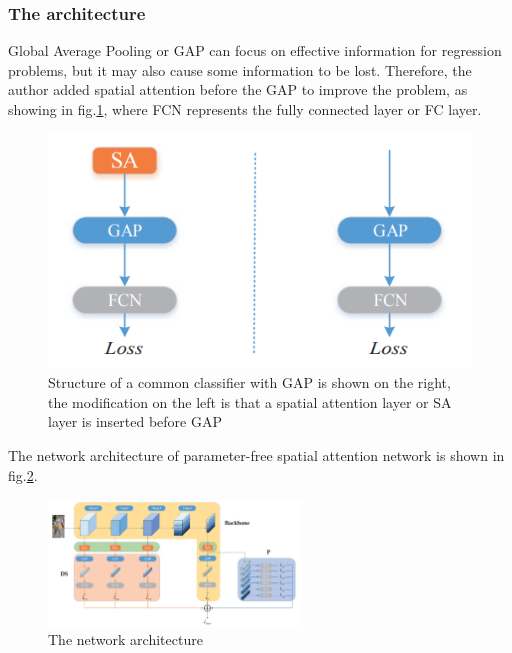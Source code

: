 \subsubsection{The architecture}
\hspace{0.45cm} Global Average Pooling \cite{netinnet} or \acrshort{GAP} can focus on effective 
information for regression problems, 
but it may also cause some information to be lost\cite{SA}. 
Therefore, the author added spatial attention before the \acrshort{GAP} to improve the problem, 
as showing in fig.\ref{fig:sa_gap}\cite{SA}, where FCN represents the fully connected layer or \acrshort{FC} layer.\par
 \begin{figure}[h!]
     \centering
     \includegraphics[scale=0.5]{Chapters/Fig/attention-sa-gap.PNG}
     \caption{Structure of a common classifier with \acrshort{GAP} is shown on the right, the modification on the left is that a spatial attention layer or \acrshort{SA} layer is inserted before \acrshort{GAP}}
     \label{fig:sa_gap}
 \end{figure}
The network architecture of parameter-free spatial attention network is shown in fig.\ref{fig:sa_arc}\cite{SA}.\par
\begin{figure}[h!]
    \centering
    \includegraphics[width=0.6\textwidth]{Chapters/Fig/attention_network.PNG}
    \caption{The network architecture}
    \label{fig:sa_arc}
\end{figure}
